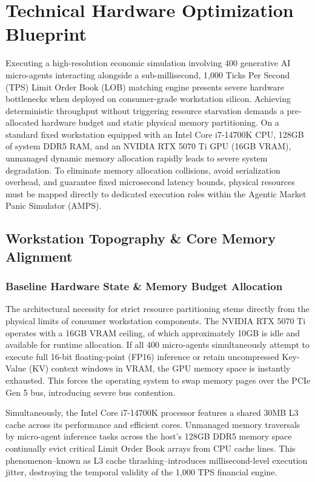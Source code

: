 \chapter{Technical Hardware Optimization Blueprint}
\label{ch:hardware_optimization_blueprint}

Executing a high-resolution economic simulation involving 400 generative AI micro-agents interacting alongside a sub-millisecond, 1,000 Ticks Per Second (TPS) Limit Order Book (LOB) matching engine presents severe hardware bottlenecks when deployed on consumer-grade workstation silicon. Achieving deterministic throughput without triggering resource starvation demands a pre-allocated hardware budget and static physical memory partitioning. On a standard fixed workstation equipped with an Intel Core i7-14700K CPU, 128GB of system DDR5 RAM, and an NVIDIA RTX 5070 Ti GPU (16GB VRAM), unmanaged dynamic memory allocation rapidly leads to severe system degradation. To eliminate memory allocation collisions, avoid serialization overhead, and guarantee fixed microsecond latency bounds, physical resources must be mapped directly to dedicated execution roles within the Agentic Market Panic Simulator (AMPS).

\section{Workstation Topography \& Core Memory Alignment}

\subsection{Baseline Hardware State \& Memory Budget Allocation}

The architectural necessity for strict resource partitioning stems directly from the physical limits of consumer workstation components. The NVIDIA RTX 5070 Ti operates with a 16GB VRAM ceiling, of which approximately 10GB is idle and available for runtime allocation. If all 400 micro-agents simultaneously attempt to execute full 16-bit floating-point (FP16) inference or retain uncompressed Key-Value (KV) context windows in VRAM, the GPU memory space is instantly exhausted. This forces the operating system to swap memory pages over the PCIe Gen 5 bus, introducing severe bus contention.

Simultaneously, the Intel Core i7-14700K processor features a shared 30MB L3 cache across its performance and efficient cores. Unmanaged memory traversals by micro-agent inference tasks across the host's 128GB DDR5 memory space continually evict critical Limit Order Book arrays from CPU cache lines. This phenomenon--known as L3 cache thrashing--introduces millisecond-level execution jitter, destroying the temporal validity of the 1,000 TPS financial engine.

